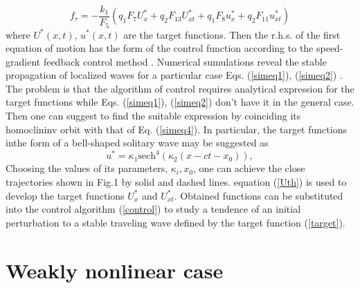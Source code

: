 \begin{equation}
	f_\tau=-\frac{k_1}{F_5}\left(q_1 F_7 U^*_x+q_2 F_{13} U^*_{xt}+q_1 F_8 u^*_x+q_2 F_{11} u^*_{xt}\right) \label{control}
\end{equation}
where $U^*(x,t)$, $u^*(x,t)$ are the target functions. Then the r.h.s. of the first equation of motion has the form of the  control function according to the speed-gradient feedback control method \cite{fradkov, porant16,  porandr17, porant17}. Numerical sumulations reveal the stable propagation of localized waves for a particular case  Eqs. (\ref{simeq1}),  (\ref{simeq2}) \cite{porant17}. The problem is that the algorithm of control requires analytical expression for the target functions while Eqs. (\ref{simeq1}),  (\ref{simeq2}) don't have it in the general case. Then one can suggest to find the suitable expression by coinciding its homoclininv orbit with that of Eq. (\ref{simeq4}). 
In particular, the target functions inthe form of a bell-shaped solitary wave may be suggested as
\begin{equation}
	u^*=\kappa_1 {\text{sech}}^4 (\kappa_2(x- c t- x_0)), \label{target}
\end{equation}
Choosing the values of its parameters, $\kappa_i, x_0$, one can achieve the close trajectories shown  in Fig.1  by solid and dashed lines. equation (\ref{Uth}) is used to develop the target functions $U^*_x$ and $U^*_{xt}$. Obtained functions can be substituted into the control algorithm (\ref{control}) to study a tendence of an initial perturbation to a stable traveling wave defined by the target function (\ref{target}).


\section{Weakly nonlinear case}

